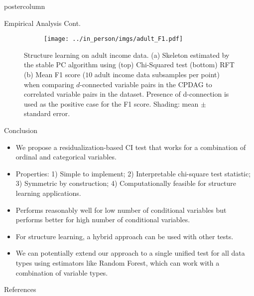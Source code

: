 \documentclass{beamer}
\begin{document}
\begin{frame}
\begin{columns}
\begin{column}{0.33\textwidth}
\begin{beamercolorbox}[center]{postercolumn}
\begin{minipage}{.98\textwidth}
{\begin{myblock}{Empirical Analysis Cont.}
\begin{figure}
\begin{subfigure}[t]{0.55\textwidth}
				\caption{}
				\label{fig:sl_adult_model}
			\end{subfigure}%
			\begin{subfigure}[t]{0.4\textwidth}
				\texttt{[image: ../in\_person/imgs/adult\_F1.pdf]}
				\caption{}
				\label{fig:sl_adult}
			\end{subfigure}
			\caption{Structure learning on adult income data. (a) Skeleton
				estimated by the stable PC algorithm using
				(top) Chi-Squared test (bottom) RFT (b) Mean F1
				score ($10$ adult income data subsamples per
				point) when comparing $d$-connected variable
				pairs in the CPDAG to correlated variable pairs
				in the dataset. Presence of d-connection is
				used as the positive case for the F1 score.
				Shading: mean $\pm$ standard error.}
		\end{figure}
	\end{myblock}\vfill
	\begin{myblock}{Conclusion}
		\begin{itemize}
			\item \justifying We propose a residualization-based CI test that works for a
				combination of ordinal and categorical
				variables.
			\item \justifying Properties: 1) Simple to implement; 2)
				Interpretable chi-square test statistic; 3)
				Symmetric by construction; 4) Computationally
				feasible for structure learning applications.
			\item \justifying Performs reasonably well for low number of
				conditional variables but performs better for
				high number of conditional variables.
			\item \justifying For structure learning, a hybrid approach can be
				used with other tests.
			\item  \justifying We can potentially extend our
				approach to a single unified test for all data
				types using estimators like Random Forest, which
				can work with a combination of variable types.
		\end{itemize}
	\end{myblock}\vfill
	\begin{myblock}{References}
		\footnotesize
		
		
	\end{myblock}\vfill
		}\end{minipage}\end{beamercolorbox}
	\end{column}
\end{columns}
\end{frame}
\end{document}
